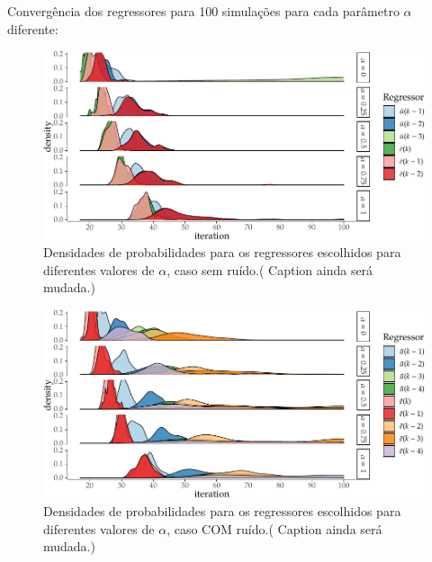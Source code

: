 \begin{exmp}
  Convergência dos regressores para 100 simulações para cada parâmetro $\alpha$ diferente:

  \begin{figure}[H]
    \centering
    \includegraphics{Figs/Cap5/ex51_iter_con_SEM_ruido.tex.pdf}
    \caption{Densidades de probabilidades para os regressores escolhidos para diferentes valores de $\alpha$, caso sem ruído.({\color{red} Caption ainda será mudada.})}
    \label{fig:exp51_itercon_ruido}
  \end{figure}

  \begin{figure}[H]
    \centering
    \includegraphics{Figs/Cap5/ex51_iter_con_COM_ruido.tex.pdf}
    \caption{Densidades de probabilidades para os regressores escolhidos para diferentes valores de $\alpha$, caso COM ruído.({\color{red} Caption ainda será mudada.})}
    \label{fig:exp51_itercon_ruido}
  \end{figure}



\end{exmp}


